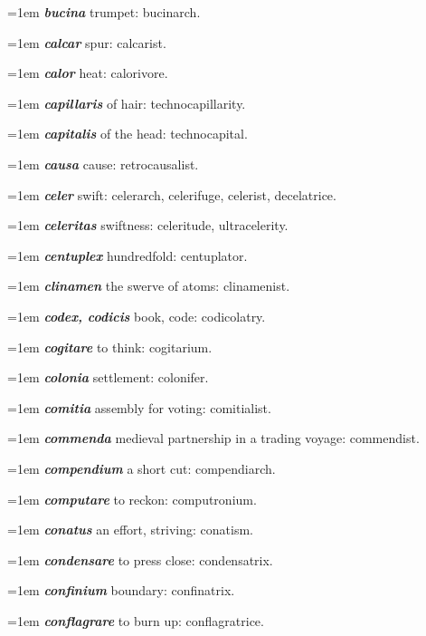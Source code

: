 \hangindent=1em \textbf{\textit{bucina}} trumpet: bucinarch.\par
\hangindent=1em \textbf{\textit{calcar}} spur: calcarist.\par
\hangindent=1em \textbf{\textit{calor}} heat: calorivore.\par
\hangindent=1em \textbf{\textit{capillaris}} of hair: technocapillarity.\par
\hangindent=1em \textbf{\textit{capitalis}} of the head: technocapital.\par
\hangindent=1em \textbf{\textit{causa}} cause: retrocausalist.\par
\hangindent=1em \textbf{\textit{celer}} swift: celerarch, celerifuge, celerist, decelatrice.\par
\hangindent=1em \textbf{\textit{celeritas}} swiftness: celeritude, ultracelerity.\par
\hangindent=1em \textbf{\textit{centuplex}} hundredfold: centuplator.\par
\hangindent=1em \textbf{\textit{clinamen}} the swerve of atoms: clinamenist.\par
\hangindent=1em \textbf{\textit{codex, codicis}} book, code: codicolatry.\par
\hangindent=1em \textbf{\textit{cogitare}} to think: cogitarium.\par
\hangindent=1em \textbf{\textit{colonia}} settlement: colonifer.\par
\hangindent=1em \textbf{\textit{comitia}} assembly for voting: comitialist.\par
\hangindent=1em \textbf{\textit{commenda}} medieval partnership in a trading voyage: commendist.\par
\hangindent=1em \textbf{\textit{compendium}} a short cut: compendiarch.\par
\hangindent=1em \textbf{\textit{computare}} to reckon: computronium.\par
\hangindent=1em \textbf{\textit{conatus}} an effort, striving: conatism.\par
\hangindent=1em \textbf{\textit{condensare}} to press close: condensatrix.\par
\hangindent=1em \textbf{\textit{confinium}} boundary: confinatrix.\par
\hangindent=1em \textbf{\textit{conflagrare}} to burn up: conflagratrice.\par
